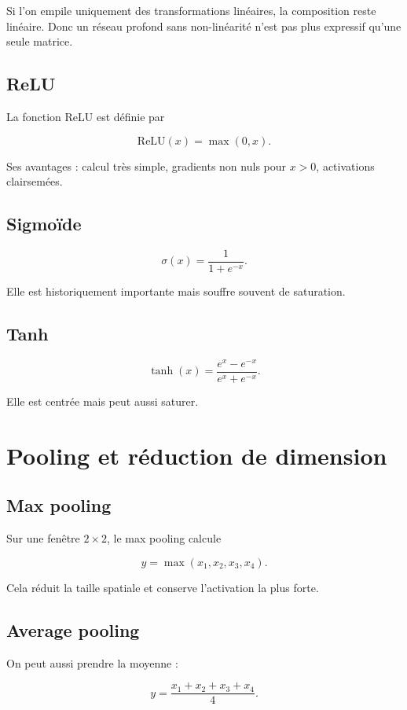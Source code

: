 \documentclass[11pt,a4paper]{article}
\begin{document}
Si l'on empile uniquement des transformations linéaires, la composition reste linéaire. Donc un réseau profond sans non-linéarité n'est pas plus expressif qu'une seule matrice.

\subsection{ReLU}

La fonction ReLU est définie par

\[
\mathrm{ReLU}(x) = \max(0,x).
\]

Ses avantages : calcul très simple, gradients non nuls pour $x>0$, activations clairsemées.

\subsection{Sigmoïde}

\[
\sigma(x) = \frac{1}{1+e^{-x}}.
\]

Elle est historiquement importante mais souffre souvent de saturation.

\subsection{Tanh}

\[
\tanh(x) = \frac{e^x-e^{-x}}{e^x+e^{-x}}.
\]

Elle est centrée mais peut aussi saturer.

\section{Pooling et réduction de dimension}

\subsection{Max pooling}

Sur une fenêtre $2 \times 2$, le max pooling calcule

\[
y = \max(x_1,x_2,x_3,x_4).
\]

Cela réduit la taille spatiale et conserve l'activation la plus forte.

\subsection{Average pooling}

On peut aussi prendre la moyenne :

\[
y = \frac{x_1+x_2+x_3+x_4}{4}.
\]
\end{document}
